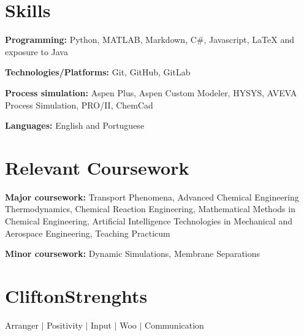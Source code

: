\documentclass[letterpaper,11pt]{article}
\newcommand{\resumeSubHeadingListStart}{\begin{itemize}[leftmargin=0.15in, label={}]}
\newcommand{\resumeSubHeadingListEnd}{\end{itemize}}
\begin{document}
\section{Skills}
  \vspace{2pt}
  \resumeSubHeadingListStart
    \small{\item{
        \textbf{Programming:}{ Python, MATLAB, Markdown, C\#, Javascript, LaTeX and exposure to Java} \\ \vspace{3pt}
        
        \textbf{Technologies/Platforms:}{ Git, GitHub, GitLab} \\ \vspace{3pt}

        \textbf{Process simulation:}{ Aspen Plus, Aspen Custom Modeler, HYSYS, AVEVA Process Simulation, PRO/II, ChemCad} \\ \vspace{3pt}
        
        \textbf{Languages:}{ English and Portuguese}
        
    }}
  \resumeSubHeadingListEnd


\section{Relevant Coursework}
  \vspace{2pt}
  \resumeSubHeadingListStart
    \small{\item{
        \textbf{Major coursework:}{ Transport Phenomena, Advanced Chemical Engineering Thermodynamics, Chemical Reaction Engineering, Mathematical Methods in Chemical Engineering, Artificial Intelligence Technologies in Mechanical and Aerospace Engineering, Teaching Practicum} \\ \vspace{3pt}
        
        \textbf{Minor coursework:}{ Dynamic Simulations, Membrane Separations}
    }}
  \resumeSubHeadingListEnd
  

\section{CliftonStrenghts}
\vspace{2pt}
\resumeSubHeadingListStart
  \small{\item{
      Arranger $|$ Positivity $|$ Input $|$ Woo $|$ Communication
  }}
\resumeSubHeadingListEnd
\end{document}
